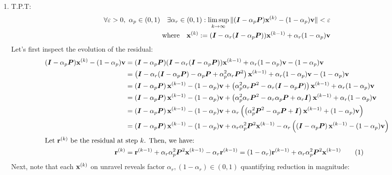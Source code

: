 \documentclass[]{exam}
\begin{document}
\begin{questions}
\newpage
\question
\hfill

\begin{enumerate}[label=\arabic*.]
	\item T.P.T:
		\begin{align*}
			\forall \eps > 0,~\alpha_p \in (0, 1) \quad \exists \alpha_r \in (0, 1): \limsup_{k \rightarrow \infty} \| (\mI - \alpha_p \mP) \vx^{(k)} - (1 - \alpha_p) \vv \| < \eps \\
			\mathrm{where} \quad \vx^{(k)} := (\mI - \alpha_r(\mI - \alpha_p \mP)) \vx^{(k - 1)} + \alpha_r (1 - \alpha_p) \vv
		\end{align*}
		Let's first inspect the evolution of the residual:
		\begin{align*}
			(\mI - \alpha_p \mP) \vx^{(k)} - (1 - \alpha_p) \vv
			&= (\mI - \alpha_p \mP) (\mI - \alpha_r(\mI - \alpha_p \mP)) \vx^{(k - 1)} + \alpha_r (1 - \alpha_p) \vv - (1 - \alpha_p) \vv \\
			&= \left(\mI - \alpha_r(\mI - \alpha_p \mP) - \alpha_p \mP + \alpha_p^2 \alpha_r \mP^2 \right) \vx^{(k - 1)} + \alpha_r (1 - \alpha_p) \vv - (1 - \alpha_p) \vv \\
			&= \left(\mI - \alpha_p \mP \right) \vx^{(k - 1)}  - (1 - \alpha_p) \vv + \left(\alpha_p^2 \alpha_r \mP^2 - \alpha_r(\mI - \alpha_p \mP) \right) \vx^{(k - 1)} + \alpha_r (1 - \alpha_p) \vv \\
			&= \left(\mI - \alpha_p \mP \right) \vx^{(k - 1)}  - (1 - \alpha_p) \vv + \left(\alpha_p^2 \alpha_r \mP^2 - \alpha_r \alpha_p \mP  + \alpha_r \mI \right) \vx^{(k-1)} + \alpha_r (1 - \alpha_p) \vv \\
			&= \left(\mI - \alpha_p \mP \right) \vx^{(k - 1)}  - (1 - \alpha_p) \vv + \alpha_r \left( \left(\alpha_p^2 \mP^2 - \alpha_p \mP + \mI \right) \vx^{(k-1)} + (1 - \alpha_p) \vv \right) \\
			&= \left(\mI - \alpha_p \mP \right) \vx^{(k - 1)}  - (1 - \alpha_p) \vv + \alpha_r \alpha_p^2 \mP^2 \vx^{(k-1)} - \alpha_r \left( \left(\mI - \alpha_p \mP \right) \vx^{(k-1)} - (1 - \alpha_p) \vv \right) \\
			\intertext{Let $\vr^{(k)}$ be the residual at step $k$. Then, we have:}
			 \vr^{(k)} &= \vr^{(k - 1)} + \alpha_r \alpha_p^2 \mP^2 \vx^{(k-1)} - \alpha_r \vr^{(k - 1)} = (1 - \alpha_r) \vr^{(k - 1)} + \alpha_r \alpha_p^2 \mP^2 \vx^{(k-1)} \tag{1}
		\end{align*}
		Next, note that each $\vx^{(k)}$ on unravel reveals factor $\alpha_r, (1 - \alpha_r) \in (0, 1)$ quantifying reduction in magnitude:
		\begin{align*}

\end{align*}
\end{enumerate}
\end{questions}
\end{document}
